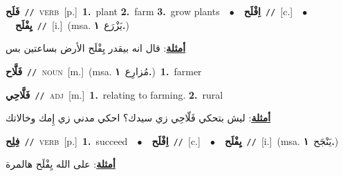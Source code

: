 \documentclass[10pt,a4paper,twoside]{article} %
\begin{document}
\begin{multicols}{2}
{\setlength\topsep{0pt}\textbf{\foreignlanguage{arabic}{فَلَح}}\ {\color{gray}\texttt{//}\color{black}}\ \textsc{verb}\ [p.]\ \textbf{1.}~plant  \textbf{2.}~farm  \textbf{3.}~grow plants\ \ $\bullet$\ \ \setlength\topsep{0pt}\textbf{\foreignlanguage{arabic}{اِفْلَح}}\ {\color{gray}\texttt{//}\color{black}}\ [c.]\ \ $\bullet$\ \ \setlength\topsep{0pt}\textbf{\foreignlanguage{arabic}{يِفْلَح}}\ {\color{gray}\texttt{//}\color{black}}\ [i.]\ \color{gray}(msa. \foreignlanguage{arabic}{يَزْرَع}~\foreignlanguage{arabic}{\textbf{١.}})\color{black}\  \begin{flushright}\color{gray}\foreignlanguage{arabic}{\textbf{\underline{\foreignlanguage{arabic}{أمثلة}}}: قال انه بيقدر يِفْلَح الأرض بساعتين بس}\end{flushright}\color{black}} \vspace{2mm}

{\setlength\topsep{0pt}\textbf{\foreignlanguage{arabic}{فَلَّاح}}\ {\color{gray}\texttt{//}\color{black}}\ \textsc{noun}\ [m.]\ \color{gray}(msa. \foreignlanguage{arabic}{مُزارِع}~\foreignlanguage{arabic}{\textbf{١.}})\color{black}\ \textbf{1.}~farmer\ } \vspace{2mm}

{\setlength\topsep{0pt}\textbf{\foreignlanguage{arabic}{فَلَّاحِي}}\ {\color{gray}\texttt{//}\color{black}}\ \textsc{adj}\ [m.]\ \textbf{1.}~relating to farming.  \textbf{2.}~rural\  \begin{flushright}\color{gray}\foreignlanguage{arabic}{\textbf{\underline{\foreignlanguage{arabic}{أمثلة}}}: ليش بتحكي فَلّاحِي زي سيدك؟ احكي مدني زي إِمك وخالاتك}\end{flushright}\color{black}} \vspace{2mm}

{\setlength\topsep{0pt}\textbf{\foreignlanguage{arabic}{فِلِح}}\ {\color{gray}\texttt{//}\color{black}}\ \textsc{verb}\ [p.]\ \textbf{1.}~succeed\ \ $\bullet$\ \ \setlength\topsep{0pt}\textbf{\foreignlanguage{arabic}{اِفْلَح}}\ {\color{gray}\texttt{//}\color{black}}\ [c.]\ \ $\bullet$\ \ \setlength\topsep{0pt}\textbf{\foreignlanguage{arabic}{يِفْلَح}}\ {\color{gray}\texttt{//}\color{black}}\ [i.]\ \color{gray}(msa. \foreignlanguage{arabic}{يَنْجَح}~\foreignlanguage{arabic}{\textbf{١.}})\color{black}\  \begin{flushright}\color{gray}\foreignlanguage{arabic}{\textbf{\underline{\foreignlanguage{arabic}{أمثلة}}}: على الله يِفْلَح هالمرة}\end{flushright}\color{black}} \vspace{2mm}


\end{multicols}
\end{document}
